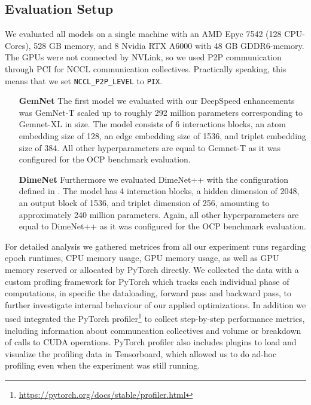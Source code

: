 \subsection{Evaluation Setup}

We evaluated all models on a single machine with an AMD Epyc 7542 (128 CPU-Cores), 528 GB memory, 
and 8 Nvidia RTX A6000 with 48 GB GDDR6-memory. The GPUs were not connected by NVLink, so we used 
P2P communication through PCI for NCCL communication collectives. Practically speaking, this 
means that we set \texttt{NCCL\_P2P\_LEVEL} to \texttt{PIX}.

\begin{enumerate}[align=left]
    \item[\textbf{GemNet}] The first model we evaluated with our DeepSpeed enhancements was GemNet-T 
    scaled up to roughly 292 million parameters corresponding to Gemnet-XL\cite*{https://doi.org/10.48550/arxiv.2203.09697}
    in size. The model consists of 6 interactions blocks, an atom embedding size of 128, an edge 
    embedding size of 1536, and triplet embedding size of 384. All other hyperparameters are equal 
    to Gemnet-T as it was configured for the OCP benchmark evaluation.

    \item[\textbf{DimeNet}] Furthermore we evaluated DimeNet++ with the configuration defined in 
    \cite*{https://doi.org/10.48550/arxiv.2203.09697}. The model has 4 interaction blocks, a hidden 
    dimension of 2048, an output block of 1536, and triplet dimension of 256, amounting to approximately 
    240 million parameters. Again, all other hyperparameters are equal to DimeNet++ as it was configured 
    for the OCP benchmark evaluation.
\end{enumerate}

For detailed analysis we gathered metrices from all our experiment runs regarding epoch runtimes, 
CPU memory usage, GPU memory usage, as well as GPU memory reserved or allocated by PyTorch directly.
We collected the data with a custom profling framework for PyTorch which tracks each individual phase 
of computations, in specific the dataloading, forward pass and backward pass, to further investigate 
internal behaviour of our applied optimizations. 
In addition we used integrated the PyTorch profiler\footnote{\url{https://pytorch.org/docs/stable/profiler.html}}
to collect step-by-step performance metrics, including information about communcation collectives and 
volume or breakdown of calls to CUDA operations. PyTorch profiler also includes plugins to 
load and visualize the profiling data in Tensorboard, which allowed us to do ad-hoc profiling 
even when the experiment was still running.



